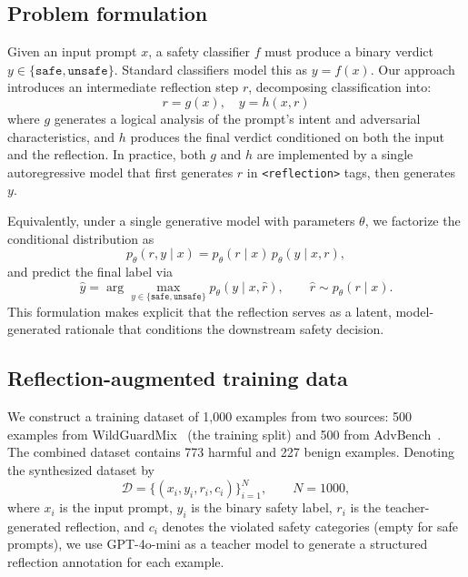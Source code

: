 \documentclass[11pt]{article}
\begin{document}
\subsection{Problem formulation}

Given an input prompt $x$, a safety classifier $f$ must produce a binary verdict $y \in \{\texttt{safe}, \texttt{unsafe}\}$. Standard classifiers model this as $y = f(x)$. Our approach introduces an intermediate reflection step $r$, decomposing classification into:
\begin{equation}
  r = g(x), \quad y = h(x, r)
\end{equation}
where $g$ generates a logical analysis of the prompt's intent and adversarial characteristics, and $h$ produces the final verdict conditioned on both the input and the reflection. In practice, both $g$ and $h$ are implemented by a single autoregressive model that first generates $r$ in \texttt{<reflection>} tags, then generates $y$.

Equivalently, under a single generative model with parameters $\theta$, we factorize the conditional distribution as
\begin{equation}
  p_{\theta}(r, y \mid x) = p_{\theta}(r \mid x) \, p_{\theta}(y \mid x, r),
\end{equation}
and predict the final label via
\begin{equation}
  \hat{y} = \arg\max_{y \in \{\texttt{safe},\texttt{unsafe}\}} p_{\theta}(y \mid x, \hat{r}),
  \qquad \hat{r} \sim p_{\theta}(r \mid x).
\end{equation}
This formulation makes explicit that the reflection serves as a latent, model-generated rationale that conditions the downstream safety decision.

\subsection{Reflection-augmented training data}
\label{sec:synthesis}

We construct a training dataset of 1{,}000 examples from two sources: 500 examples from WildGuardMix~\citep{han2024wildguard} (the training split) and 500 from AdvBench~\citep{zou2023universal}. The combined dataset contains 773 harmful and 227 benign examples. Denoting the synthesized dataset by
\begin{equation}
  \mathcal{D} = \{(x_i, y_i, r_i, c_i)\}_{i=1}^{N}, \qquad N=1000,
\end{equation}
where $x_i$ is the input prompt, $y_i$ is the binary safety label, $r_i$ is the teacher-generated reflection, and $c_i$ denotes the violated safety categories (empty for safe prompts), we use GPT-4o-mini as a teacher model to generate a structured reflection annotation for each example.
\end{document}
